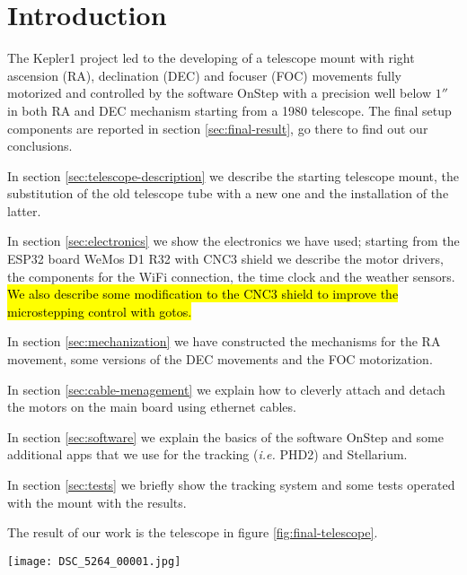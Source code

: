 \section*{Introduction}
\label{sec:Introduction}
The Kepler1 project led to the developing of a telescope mount with right ascension (RA), declination (DEC) and focuser (FOC) movements fully motorized and controlled by the software OnStep with a precision well below \(1''\) in both RA and DEC mechanism starting from a 1980 telescope.
The final setup components are reported in section \ref{sec:final-result}, go there to find out our conclusions.

In section \ref{sec:telescope-description} we describe the starting telescope mount, the substitution of the old telescope tube with a new one and the installation of the latter.

In section \ref{sec:electronics} we show the electronics we have used;
starting from the ESP32 board WeMos D1 R32 with CNC3 shield we describe the motor drivers, the components for the WiFi connection, the time clock and the weather sensors.
\hl{We also describe some modification to the CNC3 shield to improve the microstepping control with gotos.}

In section \ref{sec:mechanization} we have constructed the mechanisms for the RA movement, some versions of the DEC movements and the FOC motorization.

In section \ref{sec:cable-menagement} we explain how to cleverly attach and detach the motors on the main board using ethernet cables.

In section \ref{sec:software} we explain the basics of the software OnStep and some additional apps that we use for the tracking (\textit{i.e.} PHD2) and Stellarium.

In section \ref{sec:tests} we briefly show the tracking system and some tests operated with the mount with the results.

The result of our work is the telescope in figure \ref{fig:final-telescope}.

\begin{minipage}{0.5\textwidth}
    \centering
    \texttt{[image: DSC\_5264\_00001.jpg]}
    \label{fig:final-telescope}
\end{minipage}